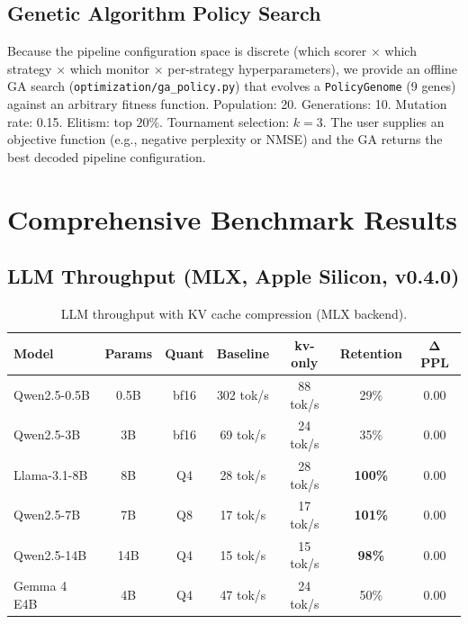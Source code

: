 \documentclass[11pt,a4paper]{article}
\begin{document}
\subsection{Genetic Algorithm Policy Search}

Because the pipeline configuration space is discrete (which scorer $\times$ which strategy $\times$ which monitor $\times$ per-strategy hyperparameters), we provide an offline GA search (\texttt{optimization/ga\_policy.py}) that evolves a \texttt{PolicyGenome} (9 genes) against an arbitrary fitness function. Population: 20. Generations: 10. Mutation rate: 0.15. Elitism: top $20\%$. Tournament selection: $k=3$. The user supplies an objective function (e.g., negative perplexity or NMSE) and the GA returns the best decoded pipeline configuration.

\section{Comprehensive Benchmark Results}

\subsection{LLM Throughput (MLX, Apple Silicon, v0.4.0)}

\begin{table}[h]
\centering
\caption{LLM throughput with KV cache compression (MLX backend).}
\label{tab:llm-throughput}
\begin{tabular}{lcccccc}
\toprule
\textbf{Model} & \textbf{Params} & \textbf{Quant} & \textbf{Baseline} & \textbf{kv-only} & \textbf{Retention} & $\boldsymbol{\Delta}$\textbf{PPL} \\
\midrule
Qwen2.5-0.5B & 0.5B & bf16 & 302 tok/s & 88 tok/s  & 29\%  & $\mathbf{0.00}$ \\
Qwen2.5-3B   & 3B   & bf16 & 69 tok/s  & 24 tok/s  & 35\%  & $\mathbf{0.00}$ \\
Llama-3.1-8B & 8B   & Q4   & 28 tok/s  & 28 tok/s  & \textbf{100\%} & $\mathbf{0.00}$ \\
Qwen2.5-7B   & 7B   & Q8   & 17 tok/s  & 17 tok/s  & \textbf{101\%} & $\mathbf{0.00}$ \\
Qwen2.5-14B  & 14B  & Q4   & 15 tok/s  & 15 tok/s  & \textbf{98\%}  & $\mathbf{0.00}$ \\
Gemma 4 E4B  & 4B   & Q4   & 47 tok/s  & 24 tok/s  & 50\%  & $\mathbf{0.00}$ \\
\bottomrule
\end{tabular}
\end{table}
\end{document}
